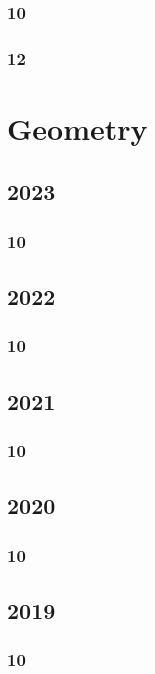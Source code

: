\documentclass[11pt]{book}
\begin{document}
\subsection{10}

\subsection{12}






\chapter{Geometry}
\section{2023}
\subsection{10}


\section{2022}
\subsection{10}


\section{2021}
\subsection{10}

\section{2020}
\subsection{10}

\section{2019}
\subsection{10}

\end{document}
